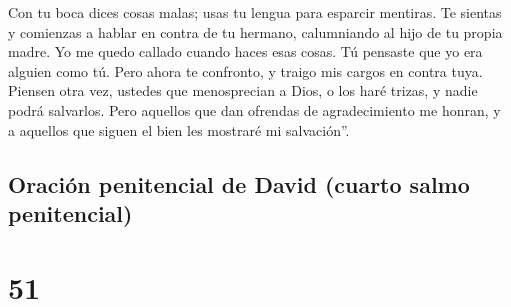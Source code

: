  Con tu boca dices cosas malas; usas tu lengua para
esparcir mentiras.  Te sientas y comienzas a hablar en
contra de tu hermano, calumniando al hijo de tu propia madre.
 Yo me quedo callado cuando haces esas cosas. Tú pensaste
que yo era alguien como tú. Pero ahora te confronto, y traigo mis cargos
en contra tuya.  Piensen otra vez, ustedes que
menosprecian a Dios, o los haré trizas, y nadie podrá salvarlos.
 Pero aquellos que dan ofrendas de agradecimiento me
honran, y a aquellos que siguen el bien les mostraré mi salvación''.

\hypertarget{oraciuxf3n-penitencial-de-david-cuarto-salmo-penitencial}{%
\subsection{Oración penitencial de David (cuarto salmo
penitencial)}\label{oraciuxf3n-penitencial-de-david-cuarto-salmo-penitencial}}

\hypertarget{section-50}{%
\section{51}\label{section-50}}


